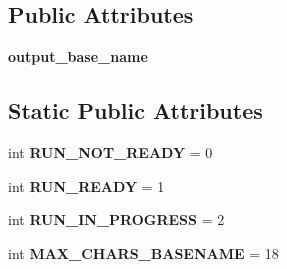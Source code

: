 \subsection*{Public Attributes}
\begin{DoxyCompactItemize}
\item 
{\bfseries output\+\_\+base\+\_\+name}\hypertarget{classnegui_1_1pgguisimupop_1_1PGGuiSimuPop_aa5f9f17f0527c20e5556b574a3f97300}{}\label{classnegui_1_1pgguisimupop_1_1PGGuiSimuPop_aa5f9f17f0527c20e5556b574a3f97300}

\end{DoxyCompactItemize}
\subsection*{Static Public Attributes}
\begin{DoxyCompactItemize}
\item 
int {\bfseries R\+U\+N\+\_\+\+N\+O\+T\+\_\+\+R\+E\+A\+DY} = 0\hypertarget{classnegui_1_1pgguisimupop_1_1PGGuiSimuPop_ae82d4be656ee869a30087fe2bab1410e}{}\label{classnegui_1_1pgguisimupop_1_1PGGuiSimuPop_ae82d4be656ee869a30087fe2bab1410e}

\item 
int {\bfseries R\+U\+N\+\_\+\+R\+E\+A\+DY} = 1\hypertarget{classnegui_1_1pgguisimupop_1_1PGGuiSimuPop_ab29a3c49b505f46c6a648dce7772fa80}{}\label{classnegui_1_1pgguisimupop_1_1PGGuiSimuPop_ab29a3c49b505f46c6a648dce7772fa80}

\item 
int {\bfseries R\+U\+N\+\_\+\+I\+N\+\_\+\+P\+R\+O\+G\+R\+E\+SS} = 2\hypertarget{classnegui_1_1pgguisimupop_1_1PGGuiSimuPop_a023efccec69461c3f9898383c24bb24b}{}\label{classnegui_1_1pgguisimupop_1_1PGGuiSimuPop_a023efccec69461c3f9898383c24bb24b}

\item 
int {\bfseries M\+A\+X\+\_\+\+C\+H\+A\+R\+S\+\_\+\+B\+A\+S\+E\+N\+A\+ME} = 18\hypertarget{classnegui_1_1pgguisimupop_1_1PGGuiSimuPop_a75a723ea82c8855efce337740a1e4c91}{}\label{classnegui_1_1pgguisimupop_1_1PGGuiSimuPop_a75a723ea82c8855efce337740a1e4c91}

\end{DoxyCompactItemize}


